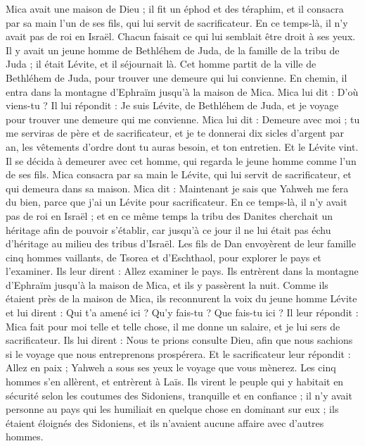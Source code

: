 \begin{multicols}{2}
Mica avait une maison de Dieu ;  il fit un éphod et des téraphim, et il consacra par sa main l'un de ses fils, qui lui servit de sacrificateur.
En ce temps-là, il n'y avait pas de roi en Israël. Chacun faisait ce qui lui semblait être droit à ses yeux.
Il y avait un jeune homme de Bethléhem de Juda, de la famille de la tribu de Juda ; il était Lévite, et il séjournait là.
Cet homme partit de la ville de Bethléhem de Juda, pour trouver une demeure qui lui convienne.  En chemin, il entra dans la montagne d'Ephraïm jusqu'à la maison de Mica.
Mica lui dit : D'où viens-tu ? Il lui répondit : Je suis Lévite, de Bethléhem de Juda, et je voyage pour trouver une demeure qui me convienne.
Mica lui dit : Demeure avec moi ; tu me serviras de père et de sacrificateur, et je te donnerai dix sicles d'argent par an, les vêtements d'ordre dont tu auras besoin, et ton entretien. Et le Lévite vint.
Il se décida à demeurer avec cet homme, qui regarda le jeune homme comme l'un de ses fils.
Mica consacra par sa main le Lévite, qui lui servit de sacrificateur, et qui demeura dans sa maison.
Mica dit : Maintenant je sais que Yahweh me fera du bien, parce que j'ai un Lévite pour sacrificateur.
\VerseOne{}En ce temps-là,  il n'y avait pas de roi en Israël ; et en ce même temps la tribu des Danites cherchait un héritage afin de pouvoir s'établir, car jusqu'à ce jour il ne lui était pas échu d'héritage au milieu des tribus d'Israël.
Les fils de Dan envoyèrent de leur famille cinq hommes vaillants, de Tsorea et d'Eschthaol, pour explorer le pays et l'examiner. Ils leur dirent : Allez examiner le pays. Ils entrèrent dans la montagne d'Ephraïm jusqu'à la maison de Mica, et ils y passèrent la nuit.
Comme ils étaient près de la maison de Mica, ils reconnurent la voix du jeune homme Lévite et lui dirent : Qui t'a amené ici ? Qu'y fais-tu ? Que fais-tu ici ?
Il leur répondit : Mica fait pour moi telle et telle chose, il me donne un salaire, et je lui sers de sacrificateur.
Ils lui dirent : Nous te prions consulte Dieu, afin que nous sachions si le voyage que nous entreprenons prospérera.
Et le sacrificateur leur répondit : Allez en paix ; Yahweh a sous ses yeux le voyage que vous mènerez.
Les cinq hommes s'en allèrent, et entrèrent à Laïs. Ils virent le peuple qui y habitait en sécurité selon les coutumes des Sidoniens, tranquille et en confiance ; il n'y avait personne au pays qui les humiliait en quelque chose en dominant sur eux ; ils étaient éloignés des Sidoniens, et ils n'avaient aucune affaire avec d'autres hommes.

\end{multicols}
